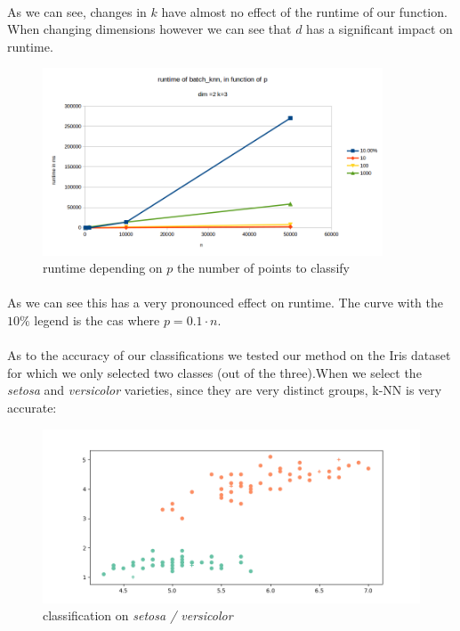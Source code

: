 \documentclass[11 pt]{article}
\begin{document}
\paragraph{}As we can see, changes in $k$ have almost no effect of the runtime of our function. When changing dimensions however we can see that $d$ has a significant impact on runtime.
\begin{center}
  \begin{figure}
    \includegraphics[width=0.9\textwidth]{figures/runP.png}
    \caption{runtime depending on $p$ the number of points to classify}
    \label{runP}
  \end{figure}
\end{center}
\paragraph{}As we can see this has a very pronounced effect on runtime. The curve with the $10\%$ legend is the cas where $p=0.1\cdot n$.
\paragraph{}As to the accuracy of our classifications we tested our method on the Iris dataset for which we only selected two classes (out of the three).When we select the \emph{setosa} and \emph{versicolor} varieties, since they are very distinct groups, k-NN is very accurate:
\begin{center}
  \begin{figure}[H]
    \includegraphics[width=\textwidth]{figures/irisClass.png}
    \caption{classification  on \emph{setosa / versicolor}}
    \label{class01}
  \end{figure}
\end{center}
\end{document}
